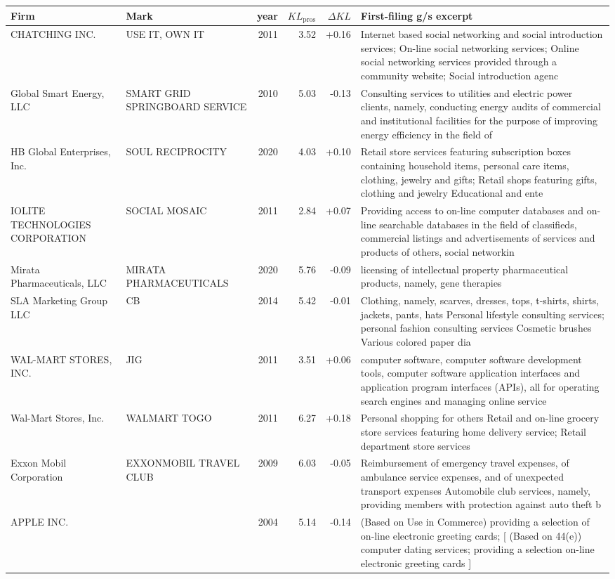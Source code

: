 \begin{tabular}{p{4.0cm}p{2.2cm}rrrp{6.5cm}}
\toprule
Firm & Mark & year & $KL_\text{pros}$ & $\Delta KL$ & First-filing g/s excerpt \\
\midrule
CHATCHING INC. & USE IT, OWN IT & 2011 & 3.52 & +0.16 & Internet based social networking and social introduction services; On-line social networking services; Online social networking services provided through a community website; Social introduction agenc \\
Global Smart Energy, LLC & SMART GRID SPRINGBOARD SERVICE & 2010 & 5.03 & -0.13 & Consulting services to utilities and electric power clients, namely, conducting energy audits of commercial and institutional facilities for the purpose of improving energy efficiency in the field of  \\
HB Global Enterprises, Inc. & SOUL RECIPROCITY & 2020 & 4.03 & +0.10 & Retail store services featuring subscription boxes containing household items, personal care items, clothing, jewelry and gifts; Retail shops featuring gifts, clothing and jewelry Educational and ente \\
IOLITE TECHNOLOGIES CORPORATION & SOCIAL MOSAIC & 2011 & 2.84 & +0.07 & Providing access to on-line computer databases and on-line searchable databases in the field of classifieds, commercial listings and advertisements of services and products of others, social networkin \\
Mirata Pharmaceuticals, LLC & MIRATA PHARMACEUTICALS & 2020 & 5.76 & -0.09 & licensing of intellectual property pharmaceutical products, namely, gene therapies \\
SLA Marketing Group LLC & CB & 2014 & 5.42 & -0.01 & Clothing, namely, scarves, dresses, tops, t-shirts, shirts, jackets, pants, hats Personal lifestyle consulting services; personal fashion consulting services Cosmetic brushes Various colored paper dia \\
WAL-MART STORES, INC. & JIG & 2011 & 3.51 & +0.06 & computer software, computer software development tools, computer software application interfaces and application program interfaces (APIs), all for operating search engines and managing online service \\
Wal-Mart Stores, Inc. & WALMART TOGO & 2011 & 6.27 & +0.18 & Personal shopping for others Retail and on-line grocery store services featuring home delivery service; Retail department store services \\
Exxon Mobil Corporation & EXXONMOBIL TRAVEL CLUB & 2009 & 6.03 & -0.05 & Reimbursement of emergency travel expenses, of ambulance service expenses, and of unexpected transport expenses Automobile club services, namely, providing members with protection against auto theft b \\
APPLE INC. &  & 2004 & 5.14 & -0.14 & (Based on Use in Commerce) providing a selection of on-line electronic greeting cards; [ (Based on 44(e)) computer dating services; providing a selection on-line electronic greeting cards ] \\
\bottomrule
\end{tabular}
\clearpage
